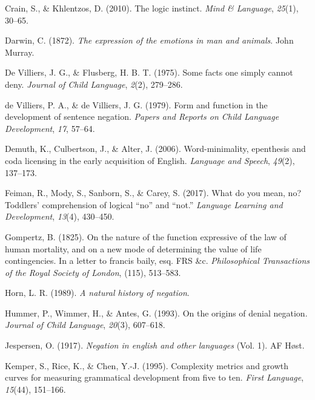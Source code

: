 \documentclass[
  man,floatsintext]{apa6}
\newlength{\cslhangindent}
\newlength{\cslentryspacingunit} %
\newenvironment{CSLReferences}[2] %
 {%
  \setlength{\parindent}{0pt}
  \ifodd #1
  \let\oldpar\par
  \def\par{\hangindent=\cslhangindent\oldpar}
  \fi
  \setlength{\parskip}{#2\cslentryspacingunit}
 }%
 {}
\begin{document}
\begin{CSLReferences}{1}{0}
\leavevmode{}%
Crain, S., \& Khlentzos, D. (2010). The logic instinct. \emph{Mind \& Language}, \emph{25}(1), 30--65.

\leavevmode{}%
Darwin, C. (1872). \emph{The expression of the emotions in man and animals}. John Murray.

\leavevmode{}%
De Villiers, J. G., \& Flusberg, H. B. T. (1975). Some facts one simply cannot deny. \emph{Journal of Child Language}, \emph{2}(2), 279--286.

\leavevmode{}%
de Villiers, P. A., \& de Villiers, J. G. (1979). Form and function in the development of sentence negation. \emph{Papers and Reports on Child Language Development}, \emph{17}, 57--64.

\leavevmode{}%
Demuth, K., Culbertson, J., \& Alter, J. (2006). Word-minimality, epenthesis and coda licensing in the early acquisition of {E}nglish. \emph{Language and Speech}, \emph{49}(2), 137--173.

\leavevmode{}%
Feiman, R., Mody, S., Sanborn, S., \& Carey, S. (2017). What do you mean, no? Toddlers' comprehension of logical {``no''} and {``not.''} \emph{Language Learning and Development}, \emph{13}(4), 430--450.

\leavevmode{}%
Gompertz, B. (1825). On the nature of the function expressive of the law of human mortality, and on a new mode of determining the value of life contingencies. In a letter to francis baily, esq. FRS \&c. \emph{Philosophical Transactions of the Royal Society of London}, (115), 513--583.

\leavevmode{}%
Horn, L. R. (1989). \emph{A natural history of negation}.

\leavevmode{}%
Hummer, P., Wimmer, H., \& Antes, G. (1993). On the origins of denial negation. \emph{Journal of Child Language}, \emph{20}(3), 607--618.

\leavevmode{}%
Jespersen, O. (1917). \emph{Negation in english and other languages} (Vol. 1). AF H{ø}st.

\leavevmode{}%
Kemper, S., Rice, K., \& Chen, Y.-J. (1995). Complexity metrics and growth curves for measuring grammatical development from five to ten. \emph{First Language}, \emph{15}(44), 151--166.


\end{CSLReferences}
\end{document}
